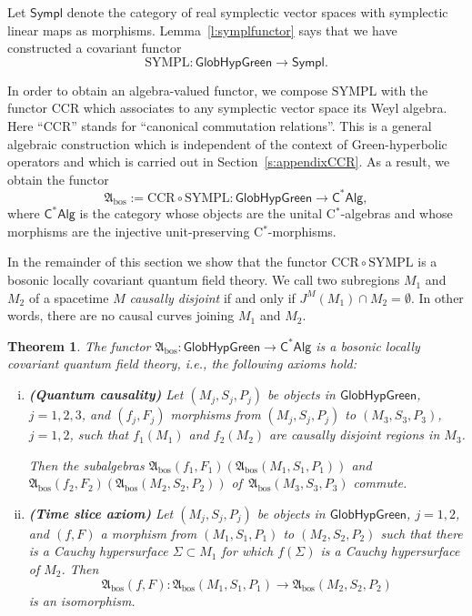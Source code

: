 \documentclass[a4paper,11pt]{amsart}
\newtheorem{thm}{Theorem}[section]
\theoremstyle{definition}
\begin{document}
Let ${\mathsf{Sympl}}$ denote the category of real symplectic vector spaces with symplectic linear maps as morphisms.
Lemma~\ref{l:symplfunctor} says that we have constructed a covariant functor
\[{\mathrm{SYMPL}}:{\mathsf{GlobHypGreen}}\longrightarrow{\mathsf{Sympl}}.\]

In order to obtain an algebra-valued functor, we compose ${\mathrm{SYMPL}}$ with the functor ${\mathrm{CCR}}$ which associates to any symplectic vector space its Weyl algebra.
Here ``CCR'' stands for ``canonical commutation relations''.
This is a general algebraic construction which is independent of the context of Green-hyperbolic operators and which is carried out in Section~\ref{s:appendixCCR}. 
As a result, we obtain the functor 
\[{\mathfrak{A}_\mathrm{bos}} := {\mathrm{CCR}}\circ{\mathrm{SYMPL}}:{\mathsf{GlobHypGreen}}\longrightarrow{\mathsf{C^*Alg}},\]
where ${\mathsf{C^*Alg}}$ is the category whose objects are the unital {\mbox{C$^*$}}-algebras and whose morphisms are the injective unit-preserving {\mbox{C$^*$}}-morphisms.

In the remainder of this section we show that the functor ${\mathrm{CCR}}\circ{\mathrm{SYMPL}}$ is a bosonic locally covariant quantum field theory.
We call two subregions $M_1$ and $M_2$ of a spacetime $M$ \emph{causally disjoint} if and only if $J^M(M_1)\cap M_2=\emptyset$.
In other words, there are no causal curves joining $M_1$ and $M_2$.

\begin{thm}\label{thm:Abos}
The functor ${\mathfrak{A}_\mathrm{bos}}:{\mathsf{GlobHypGreen}}\longrightarrow{\mathsf{C^*Alg}}$ is a bosonic locally covariant quantum field theory, i.e., the following axioms hold:
\begin{enumerate}[(i)]
\item\label{quantcaus}
\textbf{(Quantum causality)}
Let $(M_j,S_j,P_j)$ be objects in ${\mathsf{GlobHypGreen}}$, $j=1,2,3$, and $(f_j,F_j)$ morphisms from $(M_j,S_j,P_j)$ to $(M_3,S_3,P_3)$, $j=1,2$, such that $f_1(M_1)$ and $f_2(M_2)$ are causally disjoint regions in $M_3$.

Then the subalgebras ${\mathfrak{A}_\mathrm{bos}}(f_1,F_1)({\mathfrak{A}_\mathrm{bos}}(M_1,S_1,P_1))$ and ${\mathfrak{A}_\mathrm{bos}}(f_2,F_2)({\mathfrak{A}_\mathrm{bos}}(M_2,S_2,P_2))$ of\, ${\mathfrak{A}_\mathrm{bos}}(M_3,S_3,P_3)$ commute. 
\item\label{timeslice}
\textbf{(Time slice axiom)}
Let $(M_j,S_j,P_j)$ be objects in ${\mathsf{GlobHypGreen}}$, $j=1,2$, and $(f,F)$ a morphism from $(M_1,S_1,P_1)$ to $(M_2,S_2,P_2)$ such that there is a Cauchy hypersurface $\Sigma\subset M_1$ for which $f(\Sigma)$ is a Cauchy hypersurface of $M_2$.
Then 
$$
{\mathfrak{A}_\mathrm{bos}}(f,F):{\mathfrak{A}_\mathrm{bos}}(M_1,S_1,P_1) \to {\mathfrak{A}_\mathrm{bos}}(M_2,S_2,P_2)
$$ 
is an isomorphism.
\end{enumerate}
\end{thm}
\end{document}
